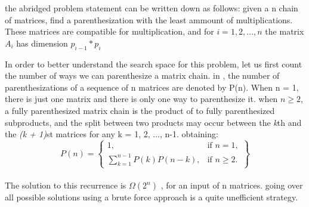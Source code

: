 the abridged problem statement can be written down as follows: given a n chain of matrices,
find a parenthesization with the least ammount of multiplications. These matrices are compatible
for multiplication, and for $i = 1, 2, ..., n$ the matrix $A_i$ has dimension $p_{i-1} * p_i$


In order to better understand the search space for this problem, let us first count the number
of ways we can parenthesize a matrix chain. in \cite{cormen2009introduction}, the number of
parenthesizations of a sequence of n matrices are denoted by P(n). When n = 1, there is just one matrix and there is only
one way to parenthesize it. when $n \geq 2$, a fully parenthesized matrix chain is the product of to 
fully parenthesized subproducts, and the split between two products may occur between the \emph{k}th and the
\emph{(k + 1)}st matrices for any k = 1, 2, ..., n-1. obtaining:
  \\
  \[
    P(n) = \left\{\begin{array}{lr}
      1, & \text{if } n = 1,\\
      \sum_{k=1}^{n-1}P(k)P(n-k), & \text{if } n \geq 2.
      \end{array}\right\}
  \]
  \\


The solution to this recurrence is $\Omega (2^n)$ \cite{cormen2009introduction}, for an input of n matrices.
going over all possible solutions using a brute force approach is a quite unefficient strategy.

